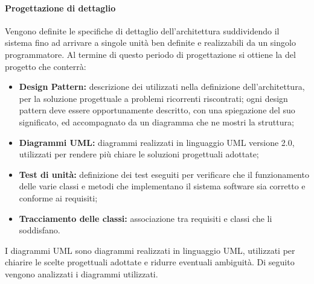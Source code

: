 \paragraph*{Progettazione di dettaglio}
Vengono definite le specifiche di dettaglio dell'architettura suddividendo il sistema fino ad arrivare a singole unità ben definite e realizzabili da un singolo programmatore. Al termine di questo periodo di progettazione si ottiene la  del progetto che conterrà: 
\begin{itemize}
	\item \textbf{Design Pattern:} descrizione dei  utilizzati nella definizione dell'architettura, per la soluzione progettuale a problemi ricorrenti riscontrati; ogni design pattern deve essere opportunamente descritto, con una spiegazione del suo significato, ed accompagnato da un diagramma che ne mostri la struttura;
	\item \textbf{Diagrammi UML:} diagrammi realizzati in linguaggio UML versione 2.0, utilizzati per rendere più chiare le soluzioni progettuali adottate; 
	\item \textbf{Test di unità:} definizione dei test eseguiti per verificare che il funzionamento delle varie classi e metodi che implementano il sistema software sia corretto e conforme ai requisiti;
	\item \textbf{Tracciamento delle classi:} associazione tra requisiti e classi che li soddisfano.
\end{itemize}

\label{DiagrammiUML}I diagrammi UML sono diagrammi realizzati in linguaggio UML, utilizzati per chiarire le scelte progettuali adottate e ridurre eventuali ambiguità. 
Di seguito vengono analizzati i diagrammi utilizzati.
